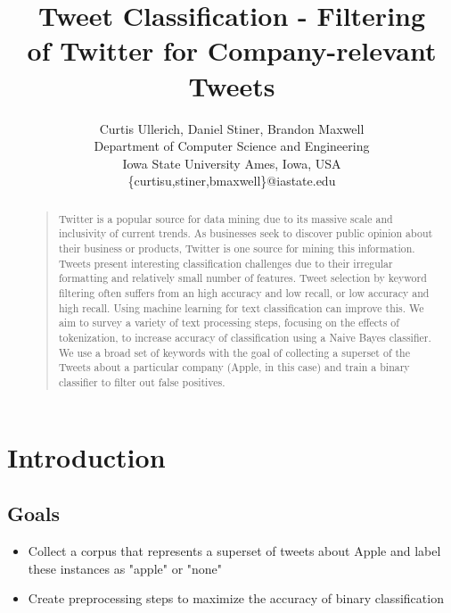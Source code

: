 \documentclass[letterpaper]{article}
\begin{document}
\title{Tweet Classification - Filtering \\ of Twitter for Company-relevant Tweets}
\author{
Curtis Ullerich, Daniel Stiner, Brandon Maxwell\\
Department of Computer Science and Engineering\\
Iowa State University
Ames, Iowa, USA\\
\{curtisu,stiner,bmaxwell\}@iastate.edu\\
}
\maketitle
\begin{abstract}
\begin{quote}
Twitter is a popular source for data mining due to its massive scale and inclusivity of current trends. As businesses seek to discover public opinion about their business or products, Twitter is one source for mining this information. Tweets present interesting classification challenges due to their irregular formatting and relatively small number of features. Tweet selection by keyword filtering often suffers from an high accuracy and low recall, or low accuracy and high recall. Using machine learning for text classification can improve this. We aim to survey a variety of text processing steps, focusing on the effects of tokenization, to increase accuracy of classification using a Naive Bayes classifier. We use a broad set of keywords with the goal of collecting a superset of the Tweets about a particular company (Apple, in this case) and train a binary classifier to filter out false positives.
\end{quote}
\end{abstract}

\section{Introduction}

\subsection{Goals}

\begin{itemize}

\item Collect a corpus that represents a superset of tweets about Apple and label these instances as "apple" or "none"
\item Create preprocessing steps to maximize the accuracy of binary classification

\end{itemize}
\end{document}
